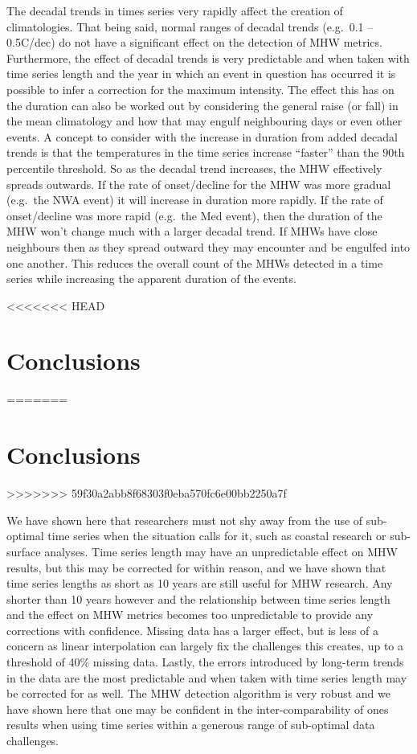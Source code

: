 \documentclass[]{article}
\begin{document}
{The decadal trends in times series very rapidly affect the creation of
climatologies. That being said, normal ranges of decadal trends
(e.g.~0.1 -- 0.5C/dec) do not have a significant effect on the detection
of MHW metrics. Furthermore, the effect of decadal trends is very
predictable and when taken with time series length and the year in which
an event in question has occurred it is possible to infer a correction
for the maximum intensity. The effect this has on the duration can also
be worked out by considering the general raise (or fall) in the mean
climatology and how that may engulf neighbouring days or even other
events. A concept to consider with the increase in duration from added
decadal trends is that the temperatures in the time series increase
``faster'' than the 90th percentile threshold. So as the decadal trend
increases, the MHW effectively spreads outwards. If the rate of
onset/decline for the MHW was more gradual (e.g.~the NWA event) it will
increase in duration more rapidly. If the rate of onset/decline was more
rapid (e.g.~the Med event), then the duration of the MHW won't change
much with a larger decadal trend. If MHWs have close neighbours then as
they spread outward they may encounter and be engulfed into one another.
This reduces the overall count of the MHWs detected in a time series
while increasing the apparent duration of the events.

<<<<<<< HEAD
\hypertarget{conclusions}{%
\section{Conclusions}\label{conclusions}}
=======
\section{Conclusions}\label{conclusions}
>>>>>>> 59f30a2abb8f68303f0eba570fc6e00bb2250a7f

We have shown here that researchers must not shy away from the use of
sub-optimal time series when the situation calls for it, such as coastal
research or sub-surface analyses. Time series length may have an
unpredictable effect on MHW results, but this may be corrected for
within reason, and we have shown that time series lengths as short as 10
years are still useful for MHW research. Any shorter than 10 years
however and the relationship between time series length and the effect
on MHW metrics becomes too unpredictable to provide any corrections with
confidence. Missing data has a larger effect, but is less of a concern
as linear interpolation can largely fix the challenges this creates, up
to a threshold of 40\% missing data. Lastly, the errors introduced by
long-term trends in the data are the most predictable and when taken
with time series length may be corrected for as well. The MHW detection
algorithm is very robust and we have shown here that one may be
confident in the inter-comparability of ones results when using time
series within a generous range of sub-optimal data challenges.

}
\end{document}

